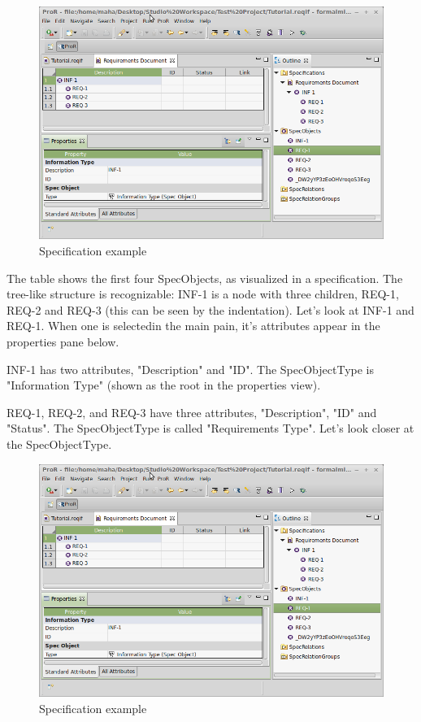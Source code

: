\begin{figure}[H]
  \centering
  \includegraphics[width=\textwidth]{../rmf-images/screenshot_INF_1.png}
  \caption{Specification example}
  \label{fig:spec_example}
\end{figure}

The table shows the first four SpecObjects, as visualized in a specification.  The tree-like structure is recognizable: INF-1 is a node
with three children, REQ-1, REQ-2 and REQ-3 (this can be seen by the indentation).  Let's look at INF-1 and REQ-1.  When one is selectedin the main pain, it's attributes appear in the properties pane below.

INF-1 has two attributes, "Description" and "ID".  The SpecObjectType is "Information Type" (shown as the root in the properties view).

REQ-1, REQ-2, and REQ-3 have three attributes, "Description", "ID" and "Status".  The SpecObjectType is called "Requirements Type".  Let's look closer at the SpecObjectType.

\begin{figure}[H]
  \centering
  \includegraphics[width=\textwidth]{../rmf-images/screenshot_INF_1.png}
  \caption{Specification example}
  \label{fig:spec_example}
\end{figure}

